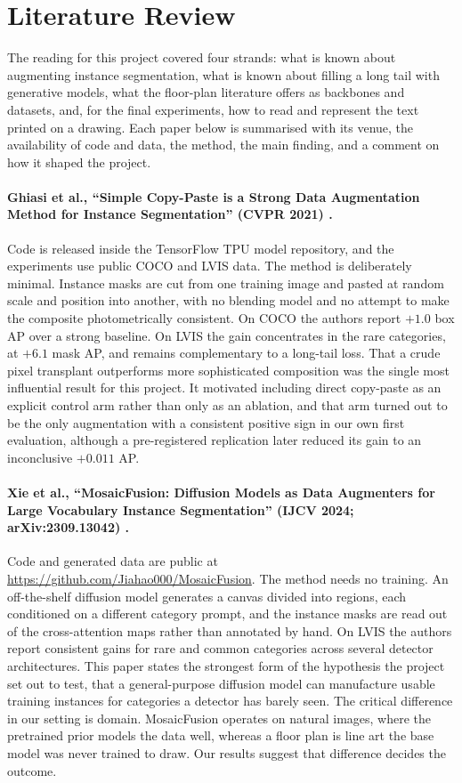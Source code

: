 \section{Literature Review}

The reading for this project covered four strands: what is known about
augmenting instance segmentation, what is known about filling a long tail with
generative models, what the floor-plan literature offers as backbones and
datasets, and, for the final experiments, how to read and represent the text
printed on a drawing. Each paper below is summarised with its venue, the availability of
code and data, the method, the main finding, and a comment on how it shaped the
project.

\paragraph{Ghiasi et al., ``Simple Copy-Paste is a Strong Data Augmentation
Method for Instance Segmentation'' (CVPR 2021) \cite{ghiasi2021copypaste}.}
Code is released inside the TensorFlow TPU model repository, and the experiments
use public COCO and LVIS data. The method is deliberately minimal. Instance
masks are cut from one training image and pasted at random scale and position
into another, with no blending model and no attempt to make the composite
photometrically consistent. On COCO the authors report $+1.0$ box AP over a
strong baseline. On LVIS the gain concentrates in the rare categories, at
$+6.1$ mask AP, and remains complementary to a long-tail loss. That a crude
pixel transplant outperforms more sophisticated composition was the single most
influential result for this project. It motivated including direct copy-paste as
an explicit control arm rather than only as an ablation, and that arm turned out to be the only augmentation with a consistent positive sign in our own first evaluation, although a pre-registered replication later reduced its gain to an inconclusive $+0.011$ AP.

\paragraph{Xie et al., ``MosaicFusion: Diffusion Models as Data Augmenters for
Large Vocabulary Instance Segmentation'' (IJCV 2024; arXiv:2309.13042)
\cite{xie2024mosaicfusion}.} Code and generated data are public at
\url{https://github.com/Jiahao000/MosaicFusion}. The method needs no training.
An off-the-shelf diffusion model generates a canvas divided into regions, each
conditioned on a different category prompt, and the instance masks are read out
of the cross-attention maps rather than annotated by hand. On LVIS the authors
report consistent gains for rare and common categories across several detector
architectures. This paper states the strongest form of the hypothesis the
project set out to test, that a general-purpose diffusion model can manufacture
usable training instances for categories a detector has barely seen. The
critical difference in our setting is domain. MosaicFusion operates on natural
images, where the pretrained prior models the data well, whereas a floor plan is
line art the base model was never trained to draw. Our results suggest that
difference decides the outcome.

